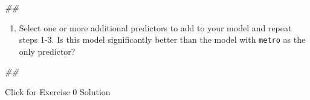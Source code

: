 \documentclass[
]{book}
\newenvironment{Shaded}{\begin{snugshade}}{\end{snugshade}}
\newcommand{\CommentTok}[1]{\textcolor[rgb]{0.56,0.35,0.01}{\textit{#1}}}
\providecommand{\tightlist}{%
  \setlength{\itemsep}{0pt}\setlength{\parskip}{0pt}}
\begin{document}
\begin{Shaded}
\begin{Highlighting}[]
\CommentTok{\#\# }
\end{Highlighting}
\end{Shaded}

\begin{enumerate}
\def\labelenumi{\arabic{enumi}.}
\setcounter{enumi}{3}
\tightlist
\item
  Select one or more additional predictors to add to your model and repeat steps 1-3. Is this model significantly better than the model with \texttt{metro} as the only predictor?
\end{enumerate}

\begin{Shaded}
\begin{Highlighting}[]
\CommentTok{\#\# }
\end{Highlighting}
\end{Shaded}

{Click for Exercise 0 Solution}
\end{document}
